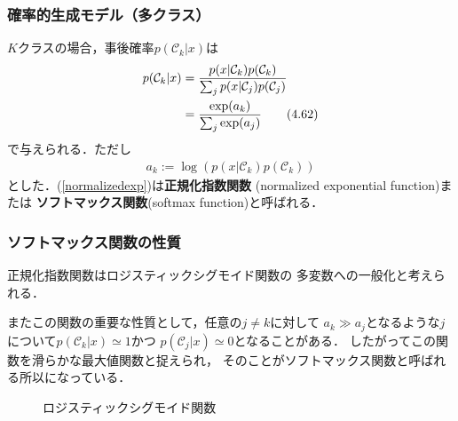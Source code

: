 \documentclass[10pt,%
hyperref={unicode}]{beamer}
\newcommand{\braref}[1]{{\fontfamily{cmr}\selectfont (\ref{#1})}}
\begin{document}
\begin{frame}
    \frametitle{確率的生成モデル（多クラス）}
    $K$クラスの場合，事後確率$p(\mathcal{C}_k|x)$は
    \begin{align}
        p(\mathcal{C}_k|x) &= \frac{p(x|\mathcal{C}_k)p(\mathcal{C}_k)}%
        {\sum_j p(x|\mathcal{C}_j)p(\mathcal{C}_j)} \notag \\
        &= \frac{\exp(a_k)}{\sum_j \exp(a_j)} \tag{4.62} \label{normalizedexp}
    \end{align}
    で与えられる．ただし
    \begin{align}
        a_k := \log (p(x|\mathcal{C}_k)p(\mathcal{C}_k)) \tag{4.63} \label{ak}
    \end{align}
    とした．\braref{normalizedexp}は\textbf{正規化指数関数}
    (normalized exponential function)または
    \textbf{ソフトマックス関数}(softmax function)と呼ばれる．

\end{frame}

\begin{frame}
    \frametitle{ソフトマックス関数の性質}
    正規化指数関数はロジスティックシグモイド関数の
    多変数への一般化と考えられる．

    \bigskip

    またこの関数の重要な性質として，任意の$j \neq k$に対して
    $a_k \gg a_j$となるような$j$について$p(\mathcal{C}_k|x) \simeq 1$かつ
    $p(\mathcal{C}_j|x) \simeq 0$となることがある．
    したがってこの関数を滑らかな最大値関数と捉えられ，
    そのことがソフトマックス関数と呼ばれる所以になっている．

    \smallskip
    \begin{figure}
        \caption{ロジスティックシグモイド関数}
        \begin{center}
        \end{center}
    \end{figure}
\end{frame}
\end{document}

